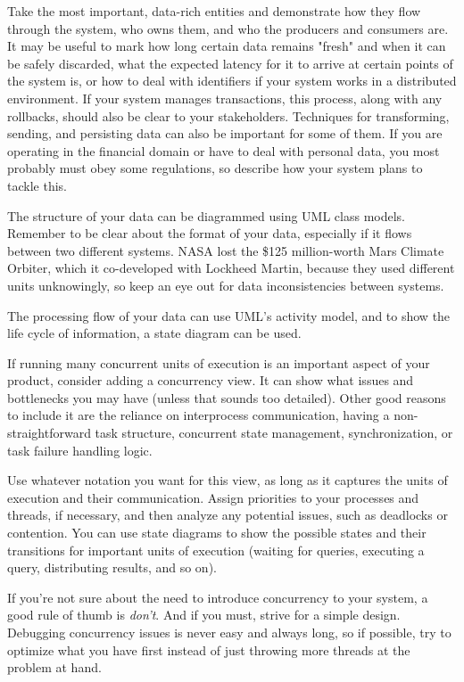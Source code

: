 Take the most important, data-rich entities and demonstrate how they flow through the system, who owns them, and who the producers and consumers are. It may be useful to mark how long certain data remains "fresh" and when it can be safely discarded, what the expected latency for it to arrive at certain points of the system is, or how to deal with identifiers if your system works in a distributed environment. If your system manages transactions, this process, along with any rollbacks, should also be clear to your stakeholders. Techniques for transforming, sending, and persisting data can also be important for some of them. If you are operating in the financial domain or have to deal with personal data, you most probably must obey some regulations, so describe how your system plans to tackle this.

The structure of your data can be diagrammed using UML class models. Remember to be clear about the format of your data, especially if it flows between two different systems. NASA lost the \$125 million-worth Mars Climate Orbiter, which it co-developed with Lockheed Martin, because they used different units unknowingly, so keep an eye out for data inconsistencies between systems.

The processing flow of your data can use UML's activity model, and to show the life cycle of information, a state diagram can be used.



If running many concurrent units of execution is an important aspect of your product, consider adding a concurrency view. It can show what issues and bottlenecks you may have (unless that sounds too detailed). Other good reasons to include it are the reliance on interprocess communication, having a non-straightforward task structure, concurrent state management, synchronization, or task failure handling logic.

Use whatever notation you want for this view, as long as it captures the units of execution and their communication. Assign priorities to your processes and threads, if necessary, and then analyze any potential issues, such as deadlocks or contention. You can use state diagrams to show the possible states and their transitions for important units of execution (waiting for queries, executing a query, distributing results, and so on).

If you're not sure about the need to introduce concurrency to your system, a good rule of thumb is \textit{don't}. And if you must, strive for a simple design. Debugging concurrency issues is never easy and always long, so if possible, try to optimize what you have first instead of just throwing more threads at the problem at hand.

